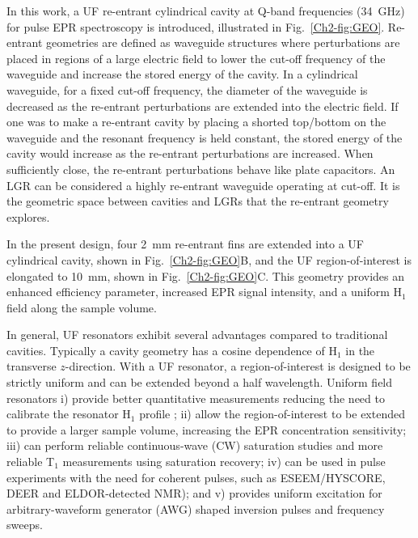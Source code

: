 In this work, a UF re-entrant cylindrical \cylTE{} cavity at Q-band frequencies (34~GHz) for pulse EPR spectroscopy is introduced, illustrated in Fig.~\ref{Ch2-fig:GEO}. Re-entrant geometries are defined as waveguide structures where perturbations are placed in regions of a large electric field to lower the cut-off frequency of the waveguide and increase the stored energy of the cavity. \cite{ramo1984fields, MITRadWaveguide} In a cylindrical waveguide, for a fixed cut-off frequency, the diameter of the waveguide is decreased as the re-entrant perturbations are extended into the electric field. If one was to make a re-entrant cavity by placing a shorted top/bottom on the waveguide and the resonant frequency is held constant, the stored energy of the cavity would increase as the re-entrant perturbations are increased. When sufficiently close, the re-entrant perturbations behave like plate capacitors. An LGR can be considered a highly re-entrant waveguide operating at cut-off. It is the geometric space between cavities and LGRs that the re-entrant geometry explores. 

In the present design, four 2~mm re-entrant fins are extended into a UF cylindrical \cylTE{} cavity, shown in Fig.~\ref{Ch2-fig:GEO}B, and the UF region-of-interest is elongated to 10~mm, shown in Fig.~\ref{Ch2-fig:GEO}C. This geometry provides an enhanced efficiency parameter, increased EPR signal intensity, and a uniform H$_1$ field along the sample volume.

In general, UF resonators exhibit several advantages compared to traditional cavities. Typically a cavity geometry has a cosine dependence of H$_1$ in the transverse $z$-direction. With a UF resonator, a region-of-interest is designed to be strictly uniform and can be extended beyond a half wavelength. Uniform field resonators i) provide better quantitative measurements reducing the need to calibrate the resonator H$_1$ profile \cite{eaton2010quantitative}; ii) allow the region-of-interest to be extended to provide a larger sample volume, increasing the EPR concentration sensitivity; iii) can perform reliable continuous-wave (CW) saturation studies \cite{klugsdsl} and more reliable T$_1$ measurements using saturation recovery;  iv) can be used in pulse experiments with the need for coherent pulses, such as ESEEM/HYSCORE, DEER\cite{pulsejeschke} and ELDOR-detected NMR\cite{COX201763}); and v) provides uniform excitation for arbitrary-waveform generator (AWG) shaped inversion pulses \cite{stollshaped, shapedpulse} and frequency sweeps. \cite{DOLL201746}

